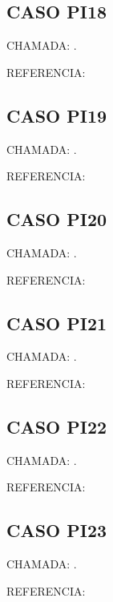 \documentclass{undftex}
\begin{document}
\begin{refsection}\section*{CASO PI18} CHAMADA: . \textcite{pi17a}\par REFERENCIA:\par\printbibliography[heading=none,check=undfconsultadas]\end{refsection}\clearpage
\begin{refsection}\section*{CASO PI19} CHAMADA: . \textcite{pi19}\par REFERENCIA:\par\printbibliography[heading=none,check=undfconsultadas]\end{refsection}\clearpage
\begin{refsection}\section*{CASO PI20} CHAMADA: . \textcite{pi20}\par REFERENCIA:\par\printbibliography[heading=none,check=undfconsultadas]\end{refsection}\clearpage
\begin{refsection}\section*{CASO PI21} CHAMADA: . \textcite{pi21}\par REFERENCIA:\par\printbibliography[heading=none,check=undfconsultadas]\end{refsection}\clearpage
\begin{refsection}\section*{CASO PI22} CHAMADA: . \textcite{pi22}\par REFERENCIA:\par\printbibliography[heading=none,check=undfconsultadas]\end{refsection}\clearpage
\begin{refsection}\section*{CASO PI23} CHAMADA: . \textcite{pi23}\par REFERENCIA:\par\printbibliography[heading=none,check=undfconsultadas]\end{refsection}\clearpage
\end{document}
